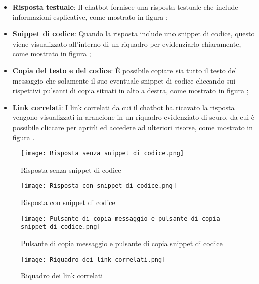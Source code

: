 \begin{itemize}
  \item \textbf{Risposta testuale}: Il chatbot fornisce una risposta testuale che include informazioni esplicative, come mostrato in figura ;
  \item \textbf{Snippet di codice}: Quando la risposta include uno snippet di codice, questo viene visualizzato all'interno di un riquadro per evidenziarlo chiaramente, come mostrato in figura ;
  \item \textbf{Copia del testo e del codice}: È possibile copiare sia tutto il testo del messaggio che solamente il suo eventuale snippet di codice cliccando sui rispettivi pulsanti di copia situati in alto a destra, come mostrato in figura ;
  \item \textbf{Link correlati}: I link correlati da cui il chatbot ha ricavato la risposta vengono visualizzati in arancione in un riquadro evidenziato di scuro, da cui è possibile cliccare per aprirli ed accedere ad ulteriori risorse, come mostrato in figura .
\end{itemize}

\newpage
\begin{figure}[h]
    \centering
        \texttt{[image: Risposta senza snippet di codice.png]}
        \caption{Risposta senza snippet di codice}
        \label{fig:Risposta senza snippet di codice}        
\end{figure}
\begin{figure}[h]
    \centering
        \texttt{[image: Risposta con snippet di codice.png]}
        \caption{Risposta con snippet di codice}
        \label{fig:Risposta con snippet di codice}        
\end{figure}
\begin{figure}[h]
    \centering
        \texttt{[image: Pulsante di copia messaggio e pulsante di copia snippet di codice.png]}
        \caption{Pulsante di copia messaggio e pulsante di copia snippet di codice}
        \label{fig:Pulsante di copia messaggio e pulsante di copia snippet di codice}        
\end{figure}
\begin{figure}[h]
    \centering
        \texttt{[image: Riquadro dei link correlati.png]}
        \caption{Riquadro dei link correlati}
        \label{fig:Riquadro dei link correlati}        
\end{figure}

